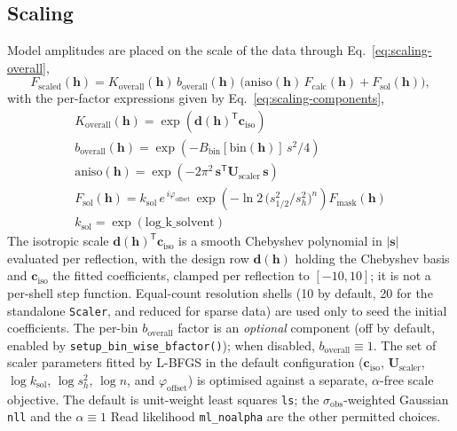 \documentclass{iucrjournals}
\begin{document}
\subsection{Scaling}\label{sec:scaling}

Model amplitudes are placed on the scale of the data through
Eq.~\ref{eq:scaling-overall},
%
\begin{equation}
  F_\mathrm{scaled}(\mathbf{h}) =
  K_\mathrm{overall}(\mathbf{h})\, b_\mathrm{overall}(\mathbf{h})\,
  \bigl(\mathrm{aniso}(\mathbf{h})\, F_\mathrm{calc}(\mathbf{h})
  + F_\mathrm{sol}(\mathbf{h})\bigr),
  \label{eq:scaling-overall}
\end{equation}
%
with the per-factor expressions given by Eq.~\ref{eq:scaling-components},
%
\begin{gather}
  K_\mathrm{overall}(\mathbf{h}) =
  \exp\!\left(\mathbf{d}(\mathbf{h})^{\mathsf{T}}\mathbf{c}_\mathrm{iso}\right) \\
  b_\mathrm{overall}(\mathbf{h}) =
  \exp\!\left(-B_\mathrm{bin}[\mathrm{bin}(\mathbf{h})]\,s^{2}/4\right) \\
  \mathrm{aniso}(\mathbf{h}) =
  \exp\!\left(-2\pi^{2}\,\mathbf{s}^{\mathsf{T}}\mathbf{U}_\mathrm{scaler}\,\mathbf{s}\right) \\
  F_\mathrm{sol}(\mathbf{h}) =
  k_\mathrm{sol}\, e^{\,i\varphi_\mathrm{offset}}\,
  \exp\!\left(-\ln 2\,\bigl(s_{1/2}^{2}/s_{h}^{2}\bigr)^{n}\right) F_\mathrm{mask}(\mathbf{h}) \\
  k_\mathrm{sol} = \exp(\mathrm{log\_k\_solvent})
  \label{eq:scaling-components}
\end{gather}
%
The isotropic scale $\mathbf{d}(\mathbf{h})^{\mathsf{T}}\mathbf{c}_\mathrm{iso}$ is a
smooth Chebyshev polynomial in $|\mathbf{s}|$ evaluated per reflection, with the design
row $\mathbf{d}(\mathbf{h})$ holding the Chebyshev basis and $\mathbf{c}_\mathrm{iso}$
the fitted coefficients, clamped per reflection to $[-10,10]$; it is not a per-shell
step function. Equal-count resolution shells (10 by default, 20 for the standalone
\texttt{Scaler}, and reduced for sparse data) are used only to seed the initial
coefficients. The per-bin
$b_\mathrm{overall}$ factor is an \emph{optional} component (off by default,
enabled by \texttt{setup\_bin\_wise\_bfactor()}); when disabled,
$b_\mathrm{overall} \equiv 1$.
The set of scaler parameters fitted by L-BFGS in the default configuration
($\mathbf{c}_\mathrm{iso}$, $\mathbf{U}_\mathrm{scaler}$, $\log
k_\mathrm{sol}$, $\log s_{h}^{2}$, $\log n$, and $\varphi_\mathrm{offset}$) is optimised
against a separate, $\alpha$-free scale objective. The default is unit-weight least
squares \texttt{ls}; the $\sigma_\mathrm{obs}$-weighted Gaussian \texttt{nll} and the
$\alpha\equiv1$ Read likelihood \texttt{ml\_noalpha} are the other permitted choices.
\end{document}

